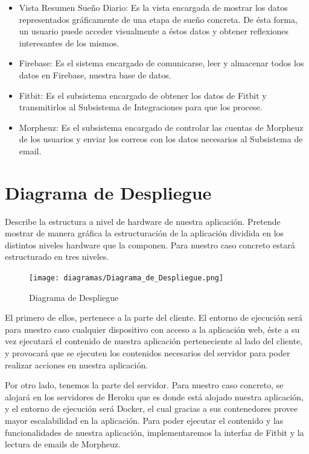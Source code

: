 \documentclass[11pt,openany]{book}
\begin{document}
\begin{itemize}
\item Vista Resumen Sueño Diario: Es la vista encargada de mostrar los datos representados gráficamente de una etapa de sueño concreta. De ésta forma, un usuario puede acceder visualmente a éstos datos y obtener reflexiones interesantes de los mismos.
\item Firebase: Es el sistema encargado de comunicarse, leer y almacenar todos los datos en Firebase, nuestra base de datos.
\item Fitbit: Es el subsistema encargado de obtener los datos de Fitbit y transmitirlos al Subsistema de Integraciones para que los procese.
\item Morpheuz: Es el subsistema encargado de controlar las cuentas de Morpheuz de los usuarios y enviar los correos con los datos necesarios al Subsistema de email.
\end{itemize}

\section{Diagrama de Despliegue}

Describe la estructura a nivel de hardware de nuestra aplicación. Pretende mostrar de manera gráfica la estructuración de la aplicación dividida en los distintos niveles hardware que la componen. Para nuestro caso concreto estará estructurado en tres niveles.

\begin{figure}[H]
\centering
\texttt{[image: diagramas/Diagrama\_de\_Despliegue.png]}
\caption{Diagrama de Despliegue}
\end{figure}

El primero de ellos, pertenece a la parte del cliente. El entorno de ejecución será para nuestro caso cualquier dispositivo con acceso a la aplicación web, éste a su vez ejecutará el contenido de nuestra aplicación perteneciente al lado del cliente, y provocará que se ejecuten los contenidos necesarios del servidor para poder realizar acciones en nuestra aplicación.

Por otro lado, tenemos la parte del servidor. Para nuestro caso concreto, se alojará en los servidores de Heroku que es donde está alojado nuestra aplicación, y el entorno de ejecución será Docker, el cual gracias a sus contenedores provee mayor escalabilidad en la aplicación. Para poder ejecutar el contenido y las funcionalidades de nuestra aplicación, implementaremos la interfaz de Fitbit y la lectura de emails de Morpheuz. 
\end{document}
